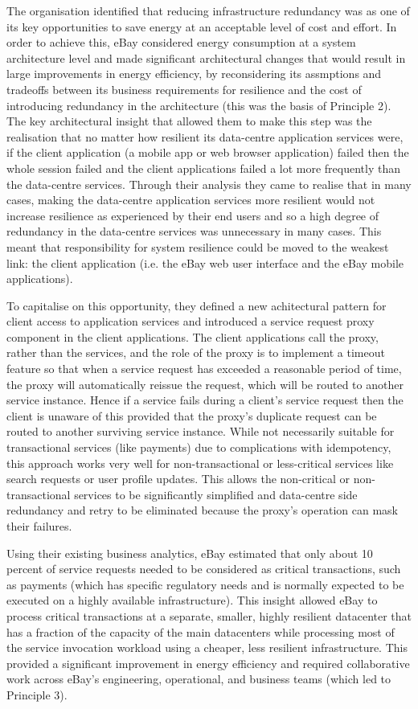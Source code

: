 The organisation identified that reducing infrastructure redundancy was as one of its key opportunities to save energy at an acceptable level of cost and effort. In order to achieve this, eBay considered energy consumption at a system architecture level and made significant architectural changes that would result in large improvements in energy efficiency, by reconsidering its assmptions and tradeoffs between its business requirements for resilience and the cost of introducing redundancy in the architecture (this was the basis of Principle 2).  The key architectural insight that allowed them to make this step was the realisation that no matter how resilient its data-centre application services were, if the client application (a mobile app or web browser application) failed then the whole session failed and the client applications failed a lot more frequently than the data-centre services.  Through their analysis they came to realise that in many cases, making the data-centre application services more resilient would not increase resilience as experienced by their end users and so a high degree of redundancy in the data-centre services was unnecessary in many cases. This meant that responsibility for system resilience could be moved to the weakest link: the client application (i.e. the eBay web user interface and the eBay mobile applications).

To capitalise on this opportunity, they defined a new achitectural pattern for client access to application services and introduced a service request proxy component in the client applications. The client applications call the proxy, rather than the services, and the role of the proxy is to implement a timeout feature so that when a service request has exceeded a reasonable period of time, the proxy will automatically reissue the request, which will be routed to another service instance.  Hence if a service fails during a client's service request then the client is unaware of this provided that the proxy's duplicate request can be routed to another surviving service instance.  While not necessarily suitable for transactional services (like payments) due to complications with idempotency, this approach works very well for non-transactional or less-critical services like search requests or user profile updates.  This allows the non-critical or non-transactional services to be significantly simplified and data-centre side redundancy and retry to be eliminated because the proxy's operation can mask their failures.

Using their existing business analytics, eBay estimated that only about 10 percent of service requests needed to be considered as critical transactions, such as payments (which has specific regulatory needs and is normally expected to be executed on a highly available infrastructure). This insight allowed eBay to process critical transactions at a separate, smaller, highly resilient datacenter that has a fraction of the capacity of the main datacenters \cite{nelson2013-ebaycasestudy} while processing most of the service invocation workload using a cheaper, less resilient infrastructure. This provided a significant improvement in energy efficiency and required collaborative work across eBay's engineering, operational, and business teams (which led to Principle 3).

